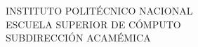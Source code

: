 
\begin{minipage}[b]{.2\textwidth}
\end{minipage}
\begin{minipage}{.6\textwidth}

  \begin{center}

        \large{INSTITUTO} \large{POLITÉCNICO} \large{NACIONAL}\\
        \large{ESCUELA} \large{SUPERIOR} \large{DE} \large{CÓMPUTO}\\
        \large{SUBDIRECCIÓN} \large{ACAMÉMICA}

  \end{center}



\end{minipage}
\begin{minipage}[b]{.2\textwidth}
\end{minipage}

